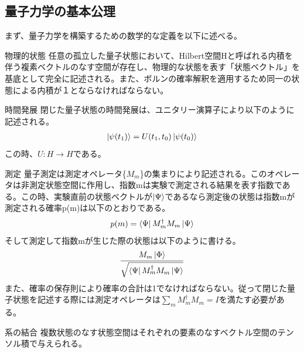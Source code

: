 \documentclass[a4paper,10.5pt]{article}
\numberwithin{equation}{section}
\begin{document}
\subsection{量子力学の基本公理}
まず、量子力学を構築するための数学的な定義を以下に述べる。\\
\begin{defbox}{物理的状態}
任意の孤立した量子状態において、Hilbert空間Hと呼ばれる内積を伴う複素ベクトルのなす空間が存在し、物理的な状態を表す「状態ベクトル」を基底として完全に記述される。また、ボルンの確率解釈を適用するため同一の状態による内積が１とならなければならない。
\end{defbox}
\begin{defbox}{時間発展}
閉じた量子状態の時間発展は、ユニタリー演算子により以下のように記述される。
 \begin{equation}\begin{split}
     \ket{\psi(t_{1})} = U(t_{1},t_{0})  \ket{\psi(t_{0})}
 \end{split} \end{equation}
この時、$U:H\to H$である。
\end{defbox}
\begin{defbox}{測定}
量子測定は測定オペレータ\{$M_{m}$\}の集まりにより記述される。このオペレータは非測定状態空間に作用し、指数mは実験で測定される結果を表す指数である。この時、実験直前の状態ベクトルが$\ket{\Psi}$であるなら測定後の状態は指数mが測定される確率p(m)は以下のとおりである。\\
 \begin{equation}\begin{split}
     p(m) = \bra{\Psi}M_{m}^{\dagger} M_{m}\ket{\Psi} 
 \end{split} \end{equation}
 そして測定して指数mが生じた際の状態は以下のように書ける。
 \begin{equation}\begin{split}
     \frac{M_{m}\ket{\Phi}}{\sqrt{\bra{\Psi}M_{m}^{\dagger} M_{m}\ket{\Psi}}}
 \end{split} \end{equation}
 また、確率の保存則により確率の合計は1でなければならない。従って閉じた量子状態を記述する際には測定オペレータは$\sum_{m}M_{m}^{\dagger} M_{m}=I$を満たす必要がある。
\end{defbox}
\begin{defbox}{系の結合}
 複数状態のなす状態空間はそれぞれの要素のなすベクトル空間のテンソル積で与えられる。
\end{defbox}
\end{document}

